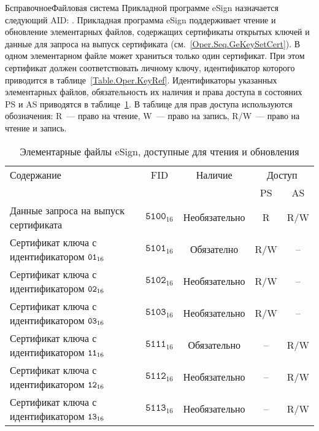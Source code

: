 \begin{appendix}{Б}{справочное}{Файловая система}
Прикладной программе eSign назначается следующий AID: 
. 
%
Прикладная программа eSign поддерживает чтение и обновление 
элементарных файлов, содержащих сертификаты открытых ключей и данные для
запроса на выпуск сертификата (см.~\ref{Oper.Seq.GeKeySetCert}). 
В одном элементарном файле может храниться только один
сертификат. При этом сертификат должен
соответствовать личному ключу, идентификатор которого приводится
в таблице~\ref{Table.Oper.KeyRef}.
Идентификаторы указанных элементарных файлов, обязательность
их наличия и права доступа в состояних PS и AS
приводятся в таблице~\ref{Table.FILES.EFSIGN}.
В таблице для прав доступа используются обозначения: 
R~--- право на чтение, W~--- право на запись,
R/W~--- право на чтение и запись.
 
\begin{table}[H]
\caption{Элементарные файлы eSign, доступные для чтения и обновления}
\label{Table.FILES.EFSIGN}
\begin{tabular}{|l|c|c|c|c|}
\hline
Содержание & FID & Наличие & \multicolumn{2}{|c|}{Доступ}\\
\cline{4-5}
& & & PS & AS \\
\hline
\hline
Данные запроса на выпуск сертификата & 
$\texttt{5100}_{16}$ & Необязательно &  R & R/W \\
Сертификат ключа с идентификатором $\texttt{01}_{16}$ & 
$\texttt{5101}_{16}$ & Обязателно & R/W & -- \\
Сертификат ключа с идентификатором $\texttt{02}_{16}$ & 
$\texttt{5102}_{16}$ & Необязательно & R/W & -- \\
Сертификат ключа с идентификатором $\texttt{03}_{16}$ & 
$\texttt{5103}_{16}$ & Необязательно & R/W & -- \\
Сертификат ключа с идентификатором $\texttt{11}_{16}$ & 
$\texttt{5111}_{16}$ & Обязательно & -- & R/W \\
Сертификат ключа с идентификатором $\texttt{12}_{16}$ & 
$\texttt{5112}_{16}$ & Необязательно &  -- & R/W \\
Сертификат ключа с идентификатором $\texttt{13}_{16}$ & 
$\texttt{5113}_{16}$ & Необязательно & -- & R/W \\
\hline
\end{tabular}
\end{table}

\mbox{}
\vfill
\mbox{}
\clearpage


\end{appendix}